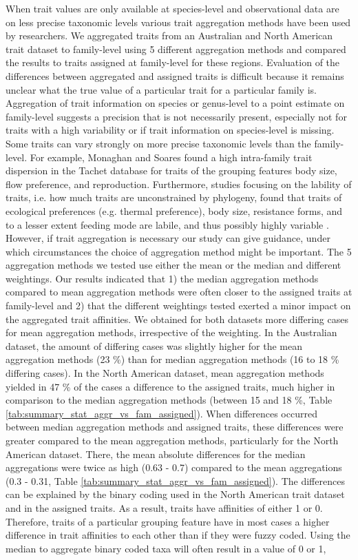\documentclass{article}
\begin{document}
When trait values are only available at species-level and observational data are on less precise taxonomic levels various trait aggregation methods have been used by researchers. We aggregated traits from an Australian and North American trait dataset to family-level using 5 different aggregation methods and compared the results to traits assigned at family-level for these regions. Evaluation of the differences between aggregated and assigned traits is difficult because it remains unclear what the true value of a particular trait for a particular family is. Aggregation of trait information on species or genus-level to a point estimate on family-level suggests a precision that is not necessarily present, especially not for traits with a high variability or if trait information on species-level is missing. Some traits can vary strongly on more precise taxonomic levels than the family-level. For example, Monaghan and Soares \cite{monaghan_improving_2013} found a high intra-family trait dispersion in the Tachet database for traits of the grouping features body size, flow preference, and reproduction. Furthermore, studies focusing on the lability of traits, i.e. how much traits are unconstrained by phylogeny, found that traits of ecological preferences (e.g. thermal preference), body size, resistance forms, and to a lesser extent feeding mode are labile, and thus possibly highly variable \cite{poff_functional_2006, wilkes_traitbased_2020}. However, if trait aggregation is necessary our study can give guidance, under which circumstances the choice of aggregation method might be important. The 5 aggregation methods we tested use either the mean or the median and different weightings. Our results indicated that 1) the median aggregation methods compared to mean aggregation methods were often closer to the assigned traits at family-level and 2) that the different weightings tested exerted a minor impact on the aggregated trait affinities. We obtained for both datasets more differing cases for mean aggregation methods, irrespective of the weighting. In the Australian dataset, the amount of differing cases was slightly higher for the mean aggregation methods (23 \%) than for median aggregation methods (16 to 18 \% differing cases). In the North American dataset, mean aggregation methods yielded in 47 \% of the cases a difference to the assigned traits, much higher in comparison to the median aggregation methods (between 15 and 18 \%, Table \ref{tab:summary_stat_aggr_vs_fam_assigned}). When differences occurred between median aggregation methods and assigned traits, these differences were greater compared to the mean aggregation methods, particularly for the North American dataset. There, the mean absolute differences for the median aggregations were twice as high (0.63 - 0.7) compared to the mean aggregations (0.3 - 0.31, Table \ref{tab:summary_stat_aggr_vs_fam_assigned}). The differences can be explained by the binary coding used in the North American trait dataset and in the assigned traits. As a result, traits have affinities of either 1 or 0. Therefore, traits of a particular grouping feature have in most cases a higher difference in trait affinities to each other than if they were fuzzy coded. Using the median to aggregate binary coded taxa will often result in a value of 0 or 1, 
\end{document}
